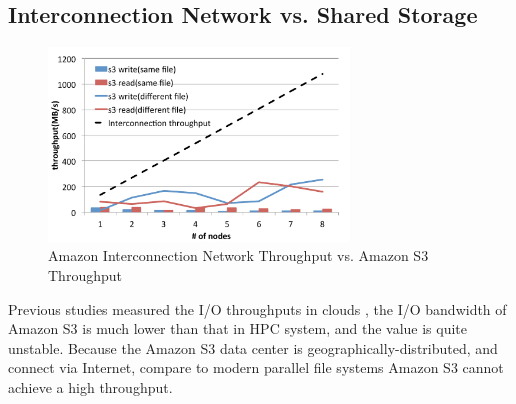 \subsection{Interconnection Network vs. Shared Storage}

\begin{figure}
\centering
\includegraphics[width=8cm]{img/amazon_throughput}
\caption{Amazon Interconnection Network Throughput vs. Amazon S3 Throughput}
\label{background:amazon throughput}
\end{figure}



Previous studies
measured the I/O throughputs in clouds \cite{Chiba,Transactions_a_la_carte,
Interactive_Use_of_Cloud_Services,Amazon_S3_for_Science_Grids, anevaluation},
the I/O bandwidth of Amazon S3 is much lower than that in HPC system, and the value is quite unstable\cite{anevaluation}.
Because the Amazon S3 data center is geographically-distributed, and connect via Internet, compare
to modern parallel file systems Amazon S3 cannot achieve a high throughput.
 

